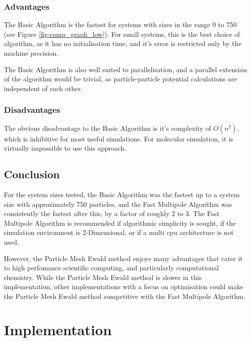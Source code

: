 \documentclass[pdftex,twoside,a4paper]{report}
\newcommand{\pmem}{Particle Mesh Ewald method}
\newcommand{\fma}{Fast Multipole Algorithm}
\begin{document}
\subsection{Advantages}
The Basic Algorithm is the fastest for systems with sizes in the range 0 to 750 (see Figure \ref{fig:comp_graph_low}). For small systems, this is the best choice of algorithm, as it has no initialisation time, and it's error is restricted only by the machine precision.

The Basic Algorithm is also well suited to parallelisation, and a parallel extension of the algorithm would be trivial, as particle-particle potential calculations are independent of each other.
\subsection{Disadvantages}
The obvious disadvantage to the Basic Algorithm is it's complexity of $O(n^2)$, which is inhibitive for most useful simulations. For molecular simulation, it is virtually impossible to use this approach.
\section{Conclusion}
For the system sizes tested, the Basic Algorithm was the fastest up to a system size with approximately 750 particles, and the \fma{} was consistently the fastest after this, by a factor of roughly 2 to 3. The \fma{} is recommended if algorithmic simplicity is sought, if the simulation environment is 2-Dimensional, or if a multi cpu architecture is not used.

However, the \pmem{} enjoys many advantages that cater it to high perfomance scientific computing, and particularly computational chemistry. While the \pmem{} is slower in this implementation, other implementations with a focus on optimisation could make the \pmem{} competitive with the \fma{}. 

\appendix
\chapter{Implementation}
\label{ap:implement}
\end{document}
